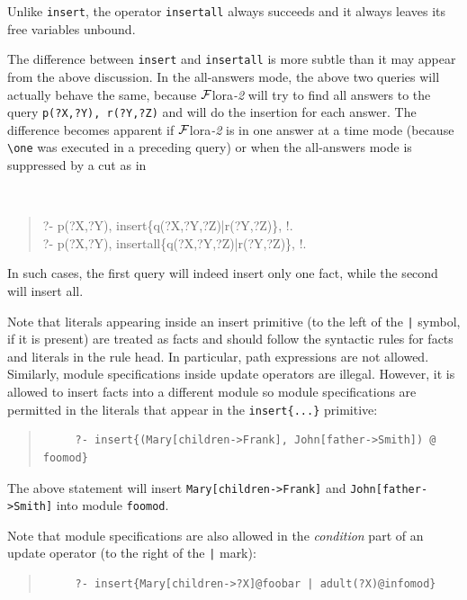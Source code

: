 \documentclass[11pt]{article}
\newcommand{\FLORA}{{\mbox{\sc ${\cal F}${lora}\rm\emph{-2}}}\xspace}
\newcommand{\FLSYSTEM}{\FLORA}
\newcommand{\bs}{\textbackslash}
\begin{document}
Unlike {\tt insert}, the operator {\tt insertall} always succeeds and it
always leaves its free variables unbound.

The difference between {\tt insert} and {\tt insertall} is more subtle than
it may appear from the above discussion. In the all-answers mode, the above
two queries will actually behave the same, because \FLSYSTEM will try to find
all answers to the query {\tt p(?X,?Y), r(?Y,?Z)} and will do the 
insertion for each answer. The difference becomes apparent if \FLSYSTEM is in
one answer at a time mode (because {\tt \bs{}one} was executed in a preceding
query) or when the all-answers mode is suppressed by a cut as in
{\tt
\begin{quote}
       ?- p(?X,?Y), insert\{q(?X,?Y,?Z)|r(?Y,?Z)\}, !.\\ 
       ?- p(?X,?Y), insertall\{q(?X,?Y,?Z)|r(?Y,?Z)\}, !.
\end{quote}
}
\noindent
In such cases, the first query will indeed insert only one fact, while the
second will insert all.

Note that literals appearing inside an insert primitive (to the left of the
\verb'|' symbol, if it is present) are treated as
facts and should follow the syntactic rules for facts and literals in the
rule head. In particular, path expressions are not allowed.
Similarly, module specifications inside update operators are illegal.
However, it is allowed to insert facts into a different module so module
specifications are permitted in the literals that appear in the 
{\tt insert\{...\}} primitive:
\begin{quote}
\begin{verbatim}
     ?- insert{(Mary[children->Frank], John[father->Smith]) @ foomod}
\end{verbatim}
\end{quote}
The above statement will insert {\tt Mary[children->Frank]} and
{\tt John[father->Smith]} into module {\tt foomod}.

Note that module specifications are also allowed in the
\emph{condition} part of an update operator (to the right of the \verb'|'
mark):
\begin{quote}
\begin{verbatim}
     ?- insert{Mary[children->?X]@foobar | adult(?X)@infomod}
\end{verbatim}
\end{quote}
\end{document}
